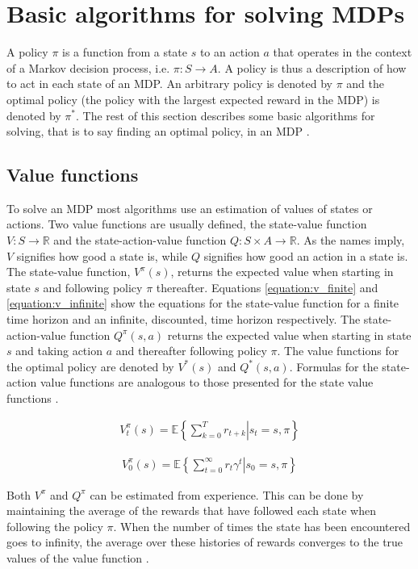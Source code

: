 \section{Basic algorithms for solving MDPs}

A policy $\pi$ is a function from a state $s$ to an action $a$ that operates in
the context of a Markov decision process, i.e. $\pi \colon S \to A$. A policy
is thus a description of how to act in each state of an MDP. An arbitrary
policy is denoted by $\pi$ and the optimal policy (the policy with the largest
expected reward in the MDP) is denoted by $\pi^*$. The rest of this section
describes some basic algorithms for solving, that is to say finding an optimal
policy, in an MDP \parencite{barto1998reinforcement}.

\subsection{Value functions}

To solve an MDP most algorithms use an estimation of values of states or
actions. Two value functions are usually defined, the state-value function $V :
S \to \mathbb R$ and the state-action-value function $Q : S \times A \to
\mathbb R$. As the names imply, $V$ signifies how good a state is, while $Q$
signifies how good an action in a state is. The state-value function,
$V^\pi(s)$, returns the expected value when starting in state $s$ and following
policy $\pi$ thereafter. Equations \eqref{equation:v_finite} and
\eqref{equation:v_infinite} show the equations for the state-value function for
a finite time horizon and an infinite, discounted, time horizon respectively.
The state-action-value function $Q^\pi(s, a)$ returns the expected value when
starting in state $s$ and taking action $a$ and thereafter following policy
$\pi$. The value functions for the optimal policy are denoted by $V^*(s)$ and
$Q^*(s, a)$. Formulas for the state-action value functions are analogous to
those presented for the state value functions
\parencite{barto1998reinforcement}. 

\begin{align}
\label{equation:v_finite}
V_t^\pi(s) = \mathbb{E} \left\{\left. \sum^{T}_{k=0} r_{t+k} \right\vert s_t = s, \pi \right\}
\end{align}

\begin{align}
\label{equation:v_infinite}
V_{0}^\pi(s) = \mathbb{E} \left\{\left. \sum_{t=0}^\infty r_{t}\gamma^t \right\vert s_0 = s,\pi \right\}
\end{align}

Both $V^\pi$ and $Q^\pi$ can be estimated from experience. This can be done by
maintaining the average of the rewards that have followed each state when
following the policy $\pi$. When the number of times the state has been
encountered goes to infinity, the average over these histories of rewards
converges to the true values of the value function
\parencite{barto1998reinforcement}.




